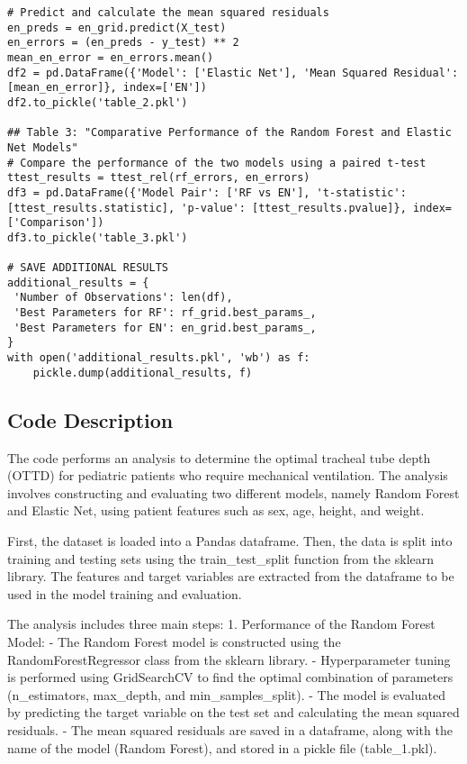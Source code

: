 \documentclass[11pt]{article}
\begin{document}
\begin{verbatim}
# Predict and calculate the mean squared residuals
en_preds = en_grid.predict(X_test)
en_errors = (en_preds - y_test) ** 2
mean_en_error = en_errors.mean()
df2 = pd.DataFrame({'Model': ['Elastic Net'], 'Mean Squared Residual': [mean_en_error]}, index=['EN'])
df2.to_pickle('table_2.pkl')

## Table 3: "Comparative Performance of the Random Forest and Elastic Net Models"
# Compare the performance of the two models using a paired t-test
ttest_results = ttest_rel(rf_errors, en_errors)
df3 = pd.DataFrame({'Model Pair': ['RF vs EN'], 't-statistic': [ttest_results.statistic], 'p-value': [ttest_results.pvalue]}, index=['Comparison'])
df3.to_pickle('table_3.pkl')

# SAVE ADDITIONAL RESULTS
additional_results = {
 'Number of Observations': len(df),
 'Best Parameters for RF': rf_grid.best_params_,
 'Best Parameters for EN': en_grid.best_params_,
}
with open('additional_results.pkl', 'wb') as f:
    pickle.dump(additional_results, f)

\end{verbatim}

\subsection{Code Description}

The code performs an analysis to determine the optimal tracheal tube depth (OTTD) for pediatric patients who require mechanical ventilation. The analysis involves constructing and evaluating two different models, namely Random Forest and Elastic Net, using patient features such as sex, age, height, and weight.

First, the dataset is loaded into a Pandas dataframe. Then, the data is split into training and testing sets using the train\_test\_split function from the sklearn library. The features and target variables are extracted from the dataframe to be used in the model training and evaluation.

The analysis includes three main steps:
1. Performance of the Random Forest Model:
   - The Random Forest model is constructed using the RandomForestRegressor class from the sklearn library.
   - Hyperparameter tuning is performed using GridSearchCV to find the optimal combination of parameters (n\_estimators, max\_depth, and min\_samples\_split).
   - The model is evaluated by predicting the target variable on the test set and calculating the mean squared residuals.
   - The mean squared residuals are saved in a dataframe, along with the name of the model (Random Forest), and stored in a pickle file (table\_1.pkl).
\end{document}
